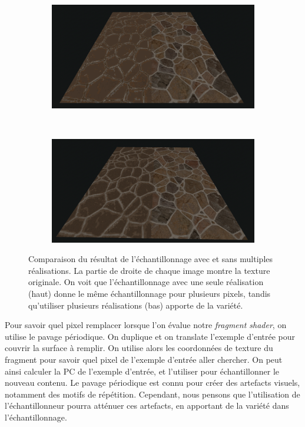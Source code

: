 \begin{figure}
    \centering
    \begin{subfigure}{.95\textwidth}
        \centering
        \includegraphics[width=\textwidth]{contenu/resources/images/partitioned_sampling_pc_preserving_no_shuffle}
    \end{subfigure}
    \\
    \begin{subfigure}{.95\textwidth}
        \centering
        \includegraphics[width=\textwidth]{contenu/resources/images/partitioned_sampling_pc_preserving_shuffle_uv}
    \end{subfigure}
    \caption[Échantillonnage avec et sans multiples réalisations]{Comparaison du résultat de l'échantillonnage avec et sans multiples réalisations. La partie de droite de chaque image montre la texture originale. On voit que l'échantillonnage avec une seule réalisation (haut) donne le même échantillonnage pour plusieurs pixels, tandis qu'utiliser plusieurs réalisations (bas) apporte de la variété.}
    \label{fig:offset-shuffle}
\end{figure}

Pour savoir quel pixel remplacer lorsque l'on évalue notre \textit{fragment shader}, on utilise le pavage périodique. On duplique et on translate l'exemple d'entrée pour couvrir la surface à remplir. On utilise alors les coordonnées de texture du fragment pour savoir quel pixel de l'exemple d'entrée aller chercher. On peut ainsi calculer la PC de l'exemple d'entrée, et l'utiliser pour échantillonner le nouveau contenu. Le pavage périodique est connu pour créer des artefacts visuels, notamment des motifs de répétition. Cependant, nous pensons que l'utilisation de l'échantillonneur pourra atténuer ces artefacts, en apportant de la variété dans l'échantillonnage.

